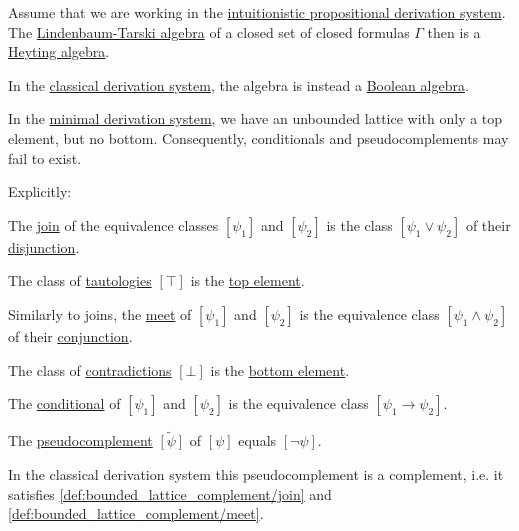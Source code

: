 \begin{proposition}\label{thm:intuitionistic_lindenbaum_tarski_algebra}
  Assume that we are working in the \hyperref[def:intuitionistic_propositional_derivation_system]{intuitionistic propositional derivation system}. The \hyperref[def:lindenbaum_tarski_algebra]{Lindenbaum-Tarski algebra} of a closed set of closed formulas \( \Gamma \) then is a \hyperref[def:heyting_algebra]{Heyting algebra}.

  In the \hyperref[def:propositional_derivation_system]{classical derivation system}, the algebra is instead a \hyperref[def:boolean_algebra]{Boolean algebra}.

  In the \hyperref[def:minimal_propositional_derivation_system]{minimal derivation system}, we have an unbounded lattice with only a top element, but no bottom. Consequently, conditionals and pseudocomplements may fail to exist.

  Explicitly:
  \begin{thmenum}
     The \hyperref[def:semilattice/join]{join} of the equivalence classes \( [\psi_1] \) and \( [\psi_2] \) is the class \( [\psi_1 \vee \psi_2] \) of their \hyperref[def:propositional_language/connectives/disjunction]{disjunction}.

     The class of \hyperref[def:propositional_semantics/tautology]{tautologies} \( [\top] \) is the \hyperref[def:partially_ordered_set_extremal_points/top_and_bottom]{top element}.

     Similarly to joins, the \hyperref[def:semilattice/meet]{meet} of \( [\psi_1] \) and \( [\psi_2] \) is the equivalence class \( [\psi_1 \wedge \psi_2] \) of their \hyperref[def:propositional_language/connectives/conjunction]{conjunction}.

     The class of \hyperref[def:propositional_semantics/contradiction]{contradictions} \( [\bot] \) is the \hyperref[def:partially_ordered_set_extremal_points/top_and_bottom]{bottom element}.

     The \hyperref[eq:def:heyting_algebra/conditional]{conditional} of \( [\psi_1] \) and \( [\psi_2] \) is the equivalence class \( [\psi_1 \rightarrow \psi_2] \).

     The \hyperref[eq:def:heyting_algebra/pseudocomplement]{pseudocomplement} \( \widetilde{[\psi]} \) of \( [\psi] \) equals \( [\neg \psi] \).

    In the classical derivation system this pseudocomplement is a complement, i.e. it satisfies \eqref{def:bounded_lattice_complement/join} and \eqref{def:bounded_lattice_complement/meet}.
  \end{thmenum}
\end{proposition}
